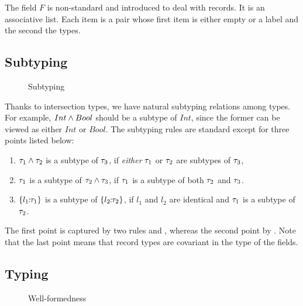 The field $ F $ is non-standard and introduced to deal with records. It is an
associative list. Each item is a pair whose first item is either empty or a
label and the second the types.




\subsection{Subtyping}

\begin{figure*}

\caption{Subtyping}
\end{figure*}

Thanks to intersection types, we have natural subtyping relations among types.
For example, $ Int \wedge Bool $ should be a subtype of $ Int $, since the former
can be viewed as either $ Int $ or $ Bool $. The subtyping rules are standard
except for three points listed below:
\begin{enumerate}
\item $ \tau_1 \wedge \tau_2 $ is a subtype of $ \tau_3 $, if \emph{either} $ \tau_1 $ or
  $ \tau_2 $ are subtypes of $ \tau_3 $,

\item $ \tau_1 $ is a subtype of $ \tau_2 \wedge \tau_3 $, if $ \tau_1 $ is a subtype of
  both $ \tau_2 $ and $ \tau_3 $.

\item $ \{ {l_1} \!\!:\!\! {\tau_1} \} $ is a subtype of $ \{ {l_2} \!\!:\!\! {\tau_2} \} $, if
  $ l_1 $ and $ l_2 $ are identical and $ \tau_1 $ is a subtype of $ \tau_2 $.
\end{enumerate}
The first point is captured by two rules  and ,
whereas the second point by . Note that the last point means
that record types are covariant in the type of the fields.

\subsection{Typing}

\begin{figure*}

\caption{Well-formedness}
\end{figure*}

